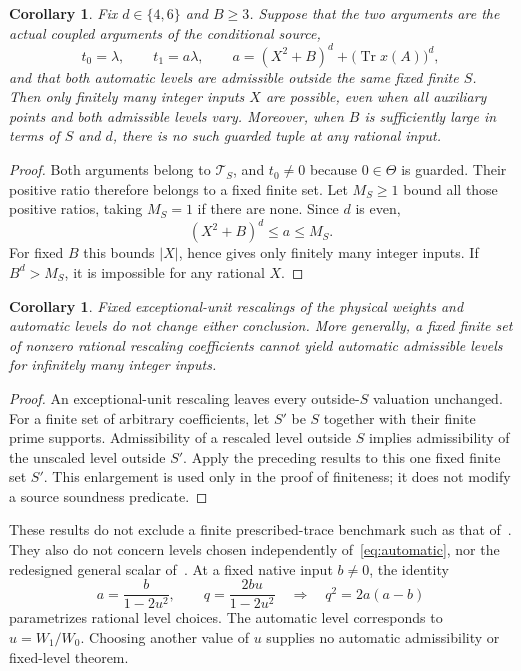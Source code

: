 \documentclass[11pt,a4paper]{article}
\newtheorem{corollary}[theorem]{Corollary}
\DeclareMathOperator{\Tr}{Tr}\DeclareMathOperator{\N}{N}
\begin{document}
\begin{corollary}\label{cor:inputs}
Fix $d\in\{4,6\}$ and $B\ge3$. Suppose that the two arguments are
the actual coupled arguments of the conditional source,
\[
 t_0=\lambda,\qquad t_1=a\lambda,\qquad
 a=(X^2+B)^d+\bigl(\Tr x(A)\bigr)^d,
\]
and that both automatic levels are admissible outside the same fixed
finite $S$. Then only finitely many integer inputs $X$ are possible,
even when all auxiliary points and both admissible levels vary.
Moreover, when $B$ is sufficiently large in terms of $S$ and $d$,
there is no such guarded tuple at any rational input.
\end{corollary}
\begin{proof}
Both arguments belong to $\mathcal T_S$, and $t_0\ne0$ because
$0\in\Theta$ is guarded. Their positive ratio therefore belongs
to a fixed finite set. Let $M_S\ge1$ bound all those positive
ratios, taking $M_S=1$ if there are none. Since $d$ is even,
\[
                        (X^2+B)^d\le a\le M_S.
\]
For fixed $B$ this bounds $|X|$, hence gives only finitely many
integer inputs. If $B^d>M_S$, it is impossible for any rational $X$.
\end{proof}

\begin{corollary}\label{cor:scaling}
Fixed exceptional-unit rescalings of the physical weights and automatic
levels do not change either conclusion. More generally, a fixed finite
set of nonzero rational rescaling coefficients cannot yield automatic
admissible levels for infinitely many integer inputs.
\end{corollary}
\begin{proof}
An exceptional-unit rescaling leaves every outside-$S$ valuation
unchanged. For a finite set of arbitrary coefficients, let $S'$ be
$S$ together with their finite prime supports. Admissibility of a
rescaled level outside $S$ implies admissibility of the unscaled
level outside $S'$. Apply the preceding results to this one fixed
finite set $S'$. This enlargement is used only in the proof of
finiteness; it does not modify a source soundness predicate.
\end{proof}

These results do not exclude a finite prescribed-trace benchmark such
as that of~\cite{Benchmark}. They also do not concern levels chosen
independently of~\eqref{eq:automatic}, nor the redesigned general scalar
of~\cite{NormPreparation}. At a fixed native input $b\ne0$, the identity
\[
 a=\frac{b}{1-2u^2},\qquad q=\frac{2bu}{1-2u^2}
 \quad\Longrightarrow\quad q^2=2a(a-b)
\]
parametrizes rational level choices. The automatic level corresponds
to $u=W_1/W_0$. Choosing another value of $u$ supplies no automatic
admissibility or fixed-level theorem.
\end{document}
